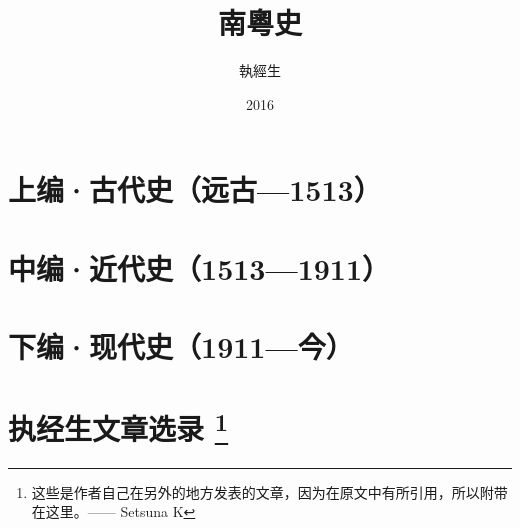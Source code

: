 \documentclass[a4paper,12pt]{ctexbook}
\newcounter{daggerfootnote}
\newcommand*{\daggerfootnote}[1]{%
	\renewcommand*{\thefootnote}{\fnsymbol{footnote}}%
	\footnote[2]{#1}%
	\renewcommand*{\thefootnote}{\arabic{footnote}}%
}
\begin{document}
		
	
	\author{執經生}
	\title{南粵史}
	\date{2016}
	
	
	\maketitle
	
	
	
	
	
	\tableofcontents
	
	\mainmatter
	
	\part{上编·古代史（远古—1513） }
	
	
	
	
	
	
	
	
	
	
	
	
	
	
	
	
	
	
	\part{中编·近代史（1513—1911）}
	
	
	
	
	
	
	
	
	
	
	
	
	
	
	
	
	
	
	
	\part{下编·现代史（1911—今）}
	
	
	
	
	
	
	
	
	
	\appendix
	
	
	
	
	\part[执经生文章选录]{执经生文章选录\protect\daggerfootnote{这些是作者自己在另外的地方发表的文章，因为在原文中有所引用，所以附带在这里。—— Setsuna K}}
	
	
	
	\backmatter
	
\end{document}
